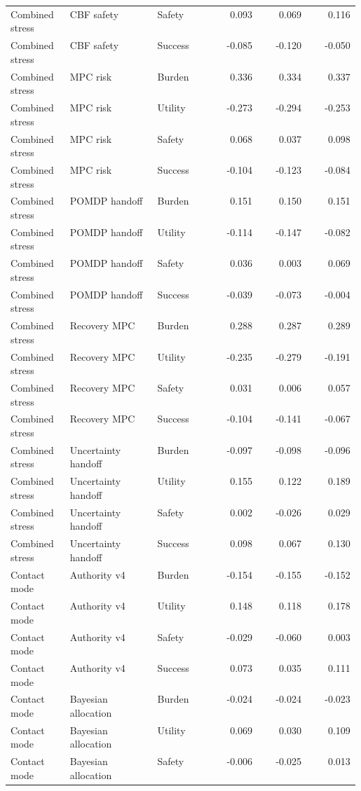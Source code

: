 \documentclass{article}
\begin{document}
\begin{center}
\begin{longtable}{p{0.17\linewidth}p{0.25\linewidth}p{0.16\linewidth}rrr}
Combined stress & CBF safety & Safety & 0.093 & 0.069 & 0.116\\
Combined stress & CBF safety & Success & -0.085 & -0.120 & -0.050\\
Combined stress & MPC risk & Burden & 0.336 & 0.334 & 0.337\\
Combined stress & MPC risk & Utility & -0.273 & -0.294 & -0.253\\
Combined stress & MPC risk & Safety & 0.068 & 0.037 & 0.098\\
Combined stress & MPC risk & Success & -0.104 & -0.123 & -0.084\\
Combined stress & POMDP handoff & Burden & 0.151 & 0.150 & 0.151\\
Combined stress & POMDP handoff & Utility & -0.114 & -0.147 & -0.082\\
Combined stress & POMDP handoff & Safety & 0.036 & 0.003 & 0.069\\
Combined stress & POMDP handoff & Success & -0.039 & -0.073 & -0.004\\
Combined stress & Recovery MPC & Burden & 0.288 & 0.287 & 0.289\\
Combined stress & Recovery MPC & Utility & -0.235 & -0.279 & -0.191\\
Combined stress & Recovery MPC & Safety & 0.031 & 0.006 & 0.057\\
Combined stress & Recovery MPC & Success & -0.104 & -0.141 & -0.067\\
Combined stress & Uncertainty handoff & Burden & -0.097 & -0.098 & -0.096\\
Combined stress & Uncertainty handoff & Utility & 0.155 & 0.122 & 0.189\\
Combined stress & Uncertainty handoff & Safety & 0.002 & -0.026 & 0.029\\
Combined stress & Uncertainty handoff & Success & 0.098 & 0.067 & 0.130\\
Contact mode & Authority v4 & Burden & -0.154 & -0.155 & -0.152\\
Contact mode & Authority v4 & Utility & 0.148 & 0.118 & 0.178\\
Contact mode & Authority v4 & Safety & -0.029 & -0.060 & 0.003\\
Contact mode & Authority v4 & Success & 0.073 & 0.035 & 0.111\\
Contact mode & Bayesian allocation & Burden & -0.024 & -0.024 & -0.023\\
Contact mode & Bayesian allocation & Utility & 0.069 & 0.030 & 0.109\\
Contact mode & Bayesian allocation & Safety & -0.006 & -0.025 & 0.013\\

\end{longtable}
\end{center}
\end{document}

